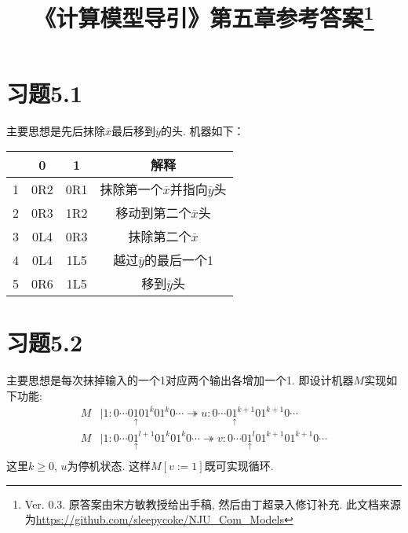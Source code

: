 \documentclass{article}
\newcommand*{\pt}[1]{\ensuremath{\underset{\uparrow}{#1}}}
\begin{document}
\title{《计算模型导引》第五章参考答案\footnote{Ver. 0.3. 原答案由宋方敏教授给出手稿, 然后由丁超录入修订补充. 此文档来源为\url{https://github.com/sleepycoke/NJU_Com_Models}}}
\maketitle

\section*{习题5.1}
主要思想是先后抹除$\overline x$最后移到$\overline y$的头. 
机器如下：
\begin{center}
	
\begin{tabular}{|c|c|c|c|}
	\hline
	&0&1&解释\\
	\hline
	1&0R2&0R1&抹除第一个$\overline x$并指向$\overline y$头\\
	2&0R3&1R2&移动到第二个$\overline x$头\\
	3&0L4&0R3&抹除第二个$\overline x$\\
	4&0L4&1L5&越过$\overline y$的最后一个1\\
	5&0R6&1L5&移到$\overline y$头\\
	\hline
\end{tabular}
\end{center}


\section*{习题5.2}
主要思想是每次抹掉输入的一个1对应两个输出各增加一个1. 
即设计机器$M$实现如下功能:\\
\begin{align*}
	M &| 1 : 0\cdots0\pt101^k01^k0\cdots \twoheadrightarrow u : 0\cdots0\pt1^{k+1}01^{k+1}0\cdots\\
	M &| 1 : 0\cdots0\pt1^{l+1}01^k01^k0\cdots \twoheadrightarrow v : 0\cdots0\pt1^l01^{k+1}01^{k+1}0\cdots\\
\end{align*}
这里$k\ge 0$, $u$为停机状态. 这样$M[v:=1]$既可实现循环. 
\end{document}
